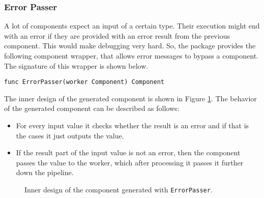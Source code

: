 \subsubsection{Error Passer}
A lot of components expect an input of a certain type. Their execution
might end with an error if they are provided with an error result from
the previous component. This would make debugging very hard. So, the 
package provides the following component wrapper, that allows error messages
to bypass a component. The signature of this wrapper is shown below.
\begin{lstlisting}
func ErrorPasser(worker Component) Component
\end{lstlisting}
The inner design of the generated component is shown in Figure 
\ref{fig:errPasserDiag}. The behavior of the generated component 
can be described as follows:
\begin{itemize}
	\item For every input value it checks whether the result is an error
		  and if that is the cases it just outputs the value.
	\item If the result part of the input value is not an error, then the component
		  passes the value to the worker, which after processing it passes 
		  it further down the pipeline.
\end{itemize}

\begin{figure}[h]
\centering
{}
\caption[scale=1.0]{Inner design of the component generated with
  \texttt{ErrorPasser}.}
\label{fig:errPasserDiag}
\end{figure}

